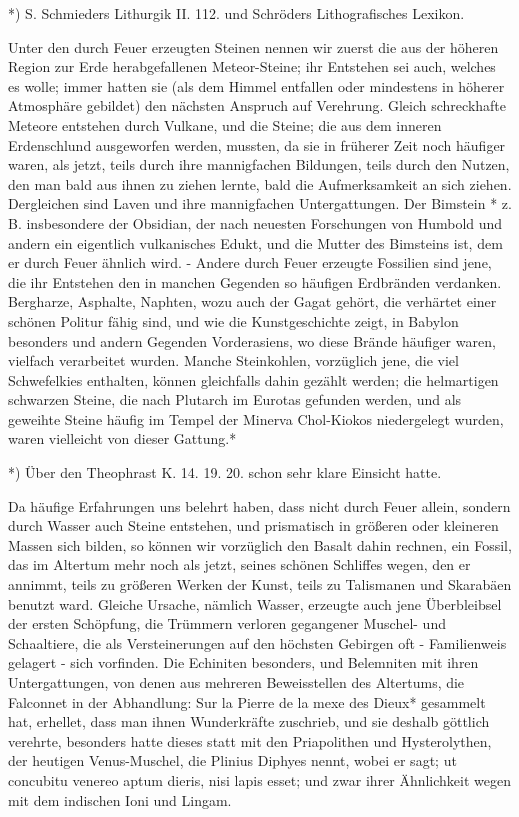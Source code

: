 \documentclass[a4paper, 11pt, oneside, polutonikogreek, german]{article}
\begin{document}
*) S. Schmieders Lithurgik II. 112. und Schröders Lithografisches Lexikon.

Unter den durch Feuer erzeugten Steinen nennen wir zuerst die aus der höheren Region zur Erde herabgefallenen Meteor-Steine; ihr Entstehen sei auch, welches es wolle; immer hatten sie (als dem Himmel entfallen oder mindestens in höherer Atmosphäre gebildet) den nächsten Anspruch auf Verehrung. Gleich schreckhafte Meteore entstehen durch Vulkane, und die Steine; die aus dem inneren Erdenschlund ausgeworfen werden, mussten, da sie in früherer Zeit noch häufiger waren, als jetzt, teils durch ihre mannigfachen Bildungen, teils durch den Nutzen, den man bald aus ihnen zu ziehen lernte, bald die Aufmerksamkeit an sich ziehen. Dergleichen sind Laven und ihre mannigfachen Untergattungen. Der Bimstein * z. B. insbesondere der Obsidian, der nach neuesten Forschungen von Humbold und andern ein eigentlich vulkanisches Edukt, und die Mutter des Bimsteins ist, dem er durch Feuer ähnlich wird. - Andere durch Feuer erzeugte Fossilien sind jene, die ihr Entstehen den in manchen Gegenden so häufigen Erdbränden verdanken. Bergharze, Asphalte, Naphten, wozu auch der Gagat gehört, die verhärtet einer schönen Politur fähig sind, und wie die Kunstgeschichte zeigt, in Babylon besonders und andern Gegenden Vorderasiens, wo diese Brände häufiger waren, vielfach verarbeitet wurden. Manche Steinkohlen, vorzüglich jene, die viel Schwefelkies enthalten, können gleichfalls dahin gezählt werden; die helmartigen schwarzen Steine, die nach Plutarch im Eurotas gefunden werden, und als geweihte Steine häufig im Tempel der Minerva Chol-Kiokos niedergelegt wurden, waren vielleicht von dieser Gattung.*

*) Über den Theophrast K. 14. 19. 20. schon sehr klare Einsicht hatte.

Da häufige Erfahrungen uns belehrt haben, dass nicht durch Feuer allein, sondern durch Wasser auch Steine entstehen, und prismatisch in größeren oder kleineren Massen sich bilden, so können wir vorzüglich den Basalt dahin rechnen, ein Fossil, das im Altertum mehr noch als jetzt, seines schönen Schliffes wegen, den er annimmt, teils zu größeren Werken der Kunst, teils zu Talismanen und Skarabäen benutzt ward. Gleiche Ursache, nämlich Wasser, erzeugte auch jene Überbleibsel der ersten Schöpfung, die Trümmern verloren gegangener Muschel- und Schaaltiere, die als Versteinerungen auf den höchsten Gebirgen oft - Familienweis gelagert - sich vorfinden. Die Echiniten besonders, und Belemniten mit ihren Untergattungen, von denen aus mehreren Beweisstellen des Altertums, die Falconnet in der Abhandlung: Sur la Pierre de la mexe des Dieux* gesammelt hat, erhellet, dass man ihnen Wunderkräfte zuschrieb, und sie deshalb göttlich verehrte, besonders hatte dieses statt mit den Priapolithen und Hysterolythen, der heutigen Venus-Muschel, die Plinius Diphyes nennt, wobei er sagt; ut concubitu venereo aptum dieris, nisi lapis esset; und zwar ihrer Ähnlichkeit wegen mit dem indischen Ioni und Lingam.
\end{document}
